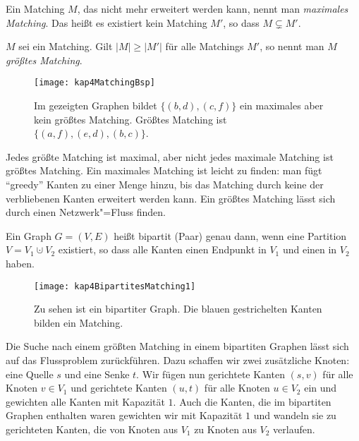 \begin{Def} 
  \hspace{\parindent}Ein Matching $M$, das nicht mehr erweitert werden kann, nennt man \textit{maximales Matching}. Das heißt es existiert kein Matching $M'$, so dass $M \subsetneq M'$.
\end{Def}

\begin{Def}
  \hspace{\parindent}$M$ sei ein Matching. Gilt $|M| \ge |M'|$ für alle Matchings $M'$, so nennt man $M$ \textit{größtes Matching}.
\end{Def}

\begin{figure}[htb]
  \centering
  \texttt{[image: kap4MatchingBsp]}
  \caption{Im gezeigten Graphen bildet $\{(b,d), (c,f)\}$ ein maximales aber kein größtes Matching. Größtes Matching ist $\{(a,f),(e,d),(b,c)\}$.}
  \label{kap4MatchingBsp}
\end{figure}

Jedes größte Matching ist maximal, aber nicht jedes maximale Matching ist größtes Matching. Ein maximales Matching ist leicht zu finden: man fügt "`greedy"' Kanten zu einer Menge hinzu, bis das Matching durch keine der verbliebenen Kanten erweitert werden kann. Ein größtes Matching lässt sich durch einen Netzwerk"=Fluss finden.

\begin{Def}
  \hspace{\parindent}Ein Graph $G=(V,E)$ heißt bipartit (Paar) genau dann, wenn eine Partition $V = V_1 \cupdot V_2$ existiert, so dass alle Kanten einen Endpunkt in $V_1$ und einen in $V_2$ haben.
\end{Def}

\begin{figure}[htb]
  \centering
  \texttt{[image: kap4BipartitesMatching1]}
  \caption{Zu sehen ist ein bipartiter Graph. Die blauen gestrichelten Kanten bilden ein Matching.}
  \label{kap4BipartitesMatching1}
\end{figure}

Die Suche nach einem größten Matching in einem bipartiten Graphen lässt sich auf das Flussproblem zurückführen. Dazu schaffen wir zwei zusätzliche Knoten: eine Quelle $s$ und eine Senke $t$. Wir fügen nun gerichtete Kanten $(s,v)$ für alle Knoten $v \in V_1$ und gerichtete Kanten $(u,t)$ für alle Knoten $u \in V_2$ ein und gewichten alle Kanten mit Kapazität $1$. Auch die Kanten, die im bipartiten Graphen enthalten waren gewichten wir mit Kapazität $1$ und wandeln sie zu gerichteten Kanten, die von Knoten aus $V_1$ zu Knoten aus $V_2$ verlaufen.

